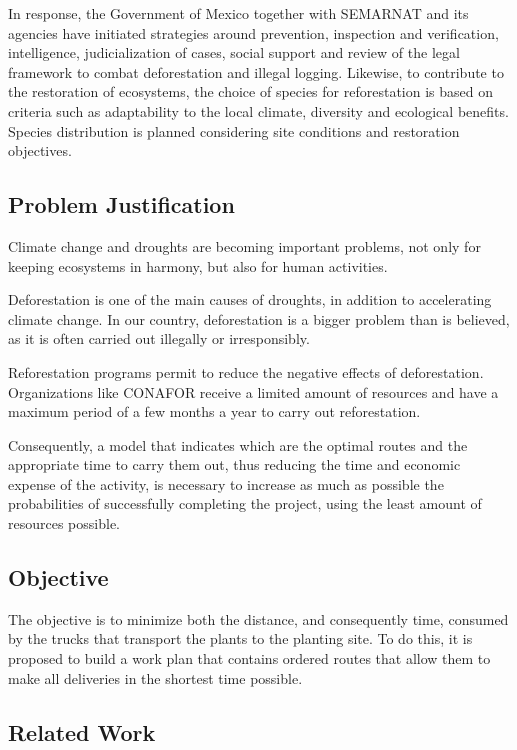 \documentclass{amsart}
\begin{document}
    In response, the Government of Mexico together with SEMARNAT and its agencies have initiated strategies around prevention, inspection and verification, intelligence, judicialization of cases, social support and review of the legal framework to combat deforestation and illegal logging. Likewise, to contribute to the restoration of ecosystems, the choice of species for reforestation is based on criteria such as adaptability to the local climate, diversity and ecological benefits. Species distribution is planned considering site conditions and restoration objectives.

        \subsection{Problem Justification}
        Climate change and droughts are becoming important problems, not only for keeping ecosystems in harmony, but also for human activities.

        Deforestation is one of the main causes of droughts, in addition to accelerating climate change. In our country, deforestation is a bigger problem than is believed, as it is often carried out illegally or irresponsibly.

        Reforestation programs permit to reduce the negative effects of deforestation. Organizations like CONAFOR receive a limited amount of resources and have a maximum period of a few months a year to carry out reforestation.

        Consequently, a model that indicates which are the optimal routes and the appropriate time to carry them out, thus reducing the time and economic expense of the activity, is necessary to increase as much as possible the probabilities of successfully completing the project, using the least amount of resources possible.


        \subsection{Objective}
        The objective is to minimize both the distance, and consequently time, consumed by the trucks that transport the plants to the planting site. To do this, it is proposed to build a work plan that contains ordered routes that allow them to make all deliveries in the shortest time possible.

        \subsection{{Related Work}}
\end{document}
